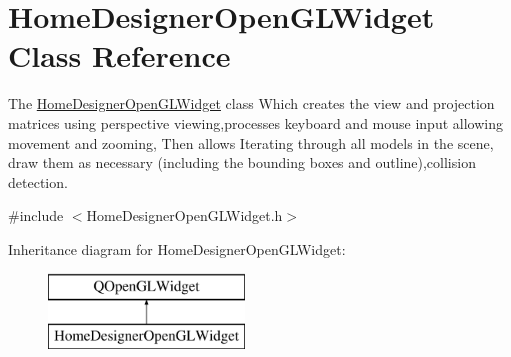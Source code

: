 \hypertarget{class_home_designer_open_g_l_widget}{}\section{Home\+Designer\+Open\+G\+L\+Widget Class Reference}
\label{class_home_designer_open_g_l_widget}


The \hyperlink{class_home_designer_open_g_l_widget}{Home\+Designer\+Open\+G\+L\+Widget} class Which creates the view and projection matrices using perspective viewing,processes keyboard and mouse input allowing movement and zooming, Then allows Iterating through all models in the scene, draw them as necessary (including the bounding boxes and outline),collision detection.  




{\ttfamily \#include $<$Home\+Designer\+Open\+G\+L\+Widget.\+h$>$}

Inheritance diagram for Home\+Designer\+Open\+G\+L\+Widget\+:\begin{figure}[H]
\begin{center}
\leavevmode
\includegraphics[height=2.000000cm]{class_home_designer_open_g_l_widget}
\end{center}
\end{figure}
